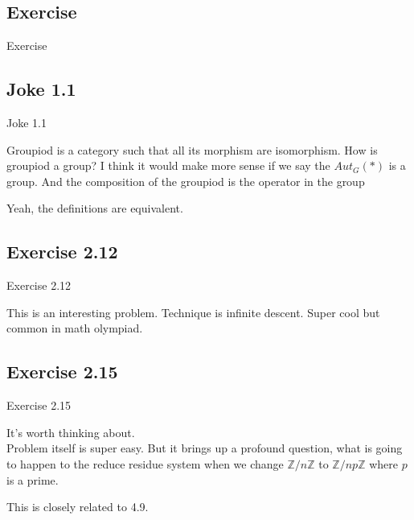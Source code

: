 \documentclass[15pt]{scrartcl}
\begin{document}
\subsection{Exercise }
\begin{discussion*}Exercise 
    \begin{abboy*}
    
    \end{abboy*}
    \begin{arthur*}
    
    \end{arthur*}
    \begin{evie*}
    
    \end{evie*}
\end{discussion*}


\subsection{Joke 1.1 }
\begin{discussion*}Joke 1.1 
    \begin{abboy*}
    Groupiod is a category such that all its morphism are isomorphism. How is groupiod a group? I think it would make more sense if we say the $Aut_G(*)$ is a group. And the composition of the groupiod is the operator in the group
    \end{abboy*}
    
    \begin{evie*}
    Yeah, the definitions are equivalent.
    \end{evie*}
\end{discussion*}


\subsection{Exercise 2.12}
\begin{discussion*}Exercise 2.12
    \begin{abboy*}
    This is an interesting problem. Technique is infinite descent. Super cool but common in math olympiad.
    \end{abboy*}
\end{discussion*}


\subsection{Exercise 2.15}
\begin{discussion*}Exercise 2.15
    \begin{abboy*}
        It's worth thinking about.
        \\
        Problem itself is super easy. But it brings up a profound question, what is going to happen to the reduce residue system when we change $\mathbb{Z}/n\mathbb{Z}$ to $\mathbb{Z}/np \mathbb{Z}$ where $p$ is a prime.
    \end{abboy*}
    \begin{evie*}
        This is closely related to 4.9.
    \end{evie*}
\end{discussion*}
\end{document}
